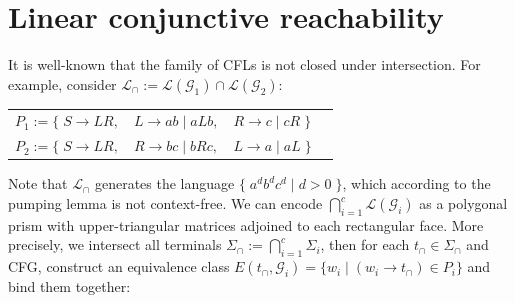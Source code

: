 \documentclass[sigplan,review,anonymous,acmsmall]{acmart}\settopmatter{printfolios=false,printccs=false,printacmref=false}
\begin{document}
\section{Linear conjunctive reachability}\label{sec:lclreach}

It is well-known that the family of CFLs is not closed under intersection. For example, consider $\mathcal{L}_\cap := \mathcal{L}(\mathcal{G}_1) \cap \mathcal{L}(\mathcal{G}_2)$:

\begin{table}[H]
\begin{tabular}{llll}
  $P_1 := \big\{\;S \rightarrow L R,$ & $L \rightarrow a b \mid a L b,$ & $R \rightarrow c \mid c R\;\big\}$\vspace{5pt}\\
  $P_2 := \big\{\;S \rightarrow L R,$ & $R \rightarrow b c \mid b R c,$ & $L \rightarrow a \mid a L\;\big\}$
\end{tabular}
\end{table}

\noindent Note that $\mathcal{L}_\cap$ generates the language $\big\{\;a^d b^d c^d \mid d > 0\;\big\}$, which according to the pumping lemma is not context-free. We can encode $\bigcap_{i=1}^c \mathcal{L}(\mathcal{G}_i)$ as a polygonal prism with upper-triangular matrices adjoined to each rectangular face. More precisely, we intersect all terminals $\Sigma_\cap := \bigcap_{i=1}^c \Sigma_i$, then for each $t_\cap \in \Sigma_\cap$ and CFG, construct an equivalence class $E(t_\cap, \mathcal{G}_i) = \{ w_i \mid (w_i \rightarrow t_\cap) \in P_i\}$ and bind them together:\vspace{-5pt}
\end{document}

